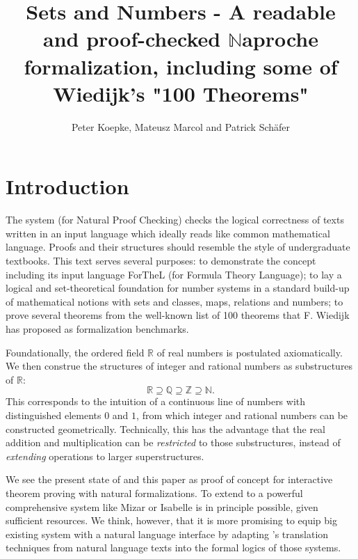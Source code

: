 \documentclass{article}
\begin{document}
\newcommand{\Prod}[3]{#1_{#2} \cdots #1_{#3}}
\newcommand{\Seq}[2]{\{#1,\dots,#2\}}
\newcommand{\FinSet}[3]{\{#1_{#2},\dots,#1_{#3}\}}
\newcommand{\Primes}{\mathbb{P}}

\title{Sets and Numbers - A readable and proof-checked $\mathbb{N}$aproche
formalization,
including some of Wiedijk's "100 Theorems"}

\author{Peter Koepke, Mateusz Marcol and Patrick Schäfer}

\maketitle

\tableofcontents
\newpage

\section*{Introduction}

The \Naproche{} system (for Natural Proof Checking)
checks the logical correctness of texts
written in an input language which ideally reads
like common mathematical language. Proofs and their 
structures should resemble the
style of undergraduate textbooks. 
This text serves several purposes: to demonstrate the 
\Naproche{} concept including its
input language ForTheL (for Formula Theory Language);
to lay a logical and set-theoretical foundation for
number systems in a standard build-up of mathematical notions
with sets and classes, maps, relations and numbers;
to prove several theorems from the well-known list of 100 theorems
that F. Wiedijk has proposed as formalization benchmarks.
 
Foundationally, the ordered field $\mathbb{R}$ of real numbers
is postulated axiomatically. We then construe the structures of integer and
rational numbers as substructures of $\mathbb{R}$:
\[ \mathbb{R} \supseteq \mathbb{Q} \supseteq \mathbb{Z}
\supseteq \mathbb{N}. \]
This corresponds to the intuition of a continuous line of numbers with
distinguished elements $0$ and $1$, from which integer and rational numbers can
be constructed geometrically. Technically, this has the advantage 
that the real addition and multiplication
can be {\em restricted} to those substructures, instead of {\em extending} operations
to larger superstructures.

We see the present state of \Naproche{} and this paper as proof of 
concept for interactive theorem
proving with natural formalizations. To extend \Naproche{} to a powerful comprehensive
system like Mizar or Isabelle is in principle possible, given sufficient resources.
We think, however, that it is more promising to equip big existing
system with a natural language interface by adapting 
\Naproche's translation techniques
from natural language texts into the formal logics of those systems.
\end{document}
